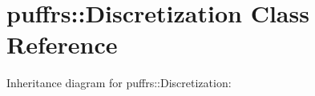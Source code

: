 \hypertarget{classpuffrs_1_1Discretization}{}\section{puffrs\+:\+:Discretization Class Reference}
\label{classpuffrs_1_1Discretization}


Inheritance diagram for puffrs\+:\+:Discretization\+:
